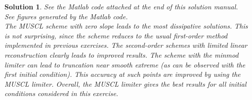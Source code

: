 \documentclass[10pt,letterpaper]{article}
\theoremstyle{break}
\newtheorem{mysolution}{Solution}
\newenvironment{solution}{\begin{mysolution}}{\end{mysolution}}
\begin{document}
\begin{solution}
	See the Matlab code attached at the end of this solution manual.
	\\

	See figures generated by the Matlab code.
	\\

	The MUSCL scheme with zero slope leads to the most dissipative solutions.
	This is not surprising, since the scheme reduces to the usual first-order method implemented in previous exercises.
	The second-order schemes with limited linear reconstruction clearly leads to improved results.
	The scheme with the minmod limiter can lead to truncation near smooth extreme (as can be observed with the first initial condition).
	This accuracy at such points are improved by using the MUSCL limiter.
	Overall, the MUSCL limiter gives the best results for all initial conditions considered in this exercise.
\end{solution}
	
\end{document}
